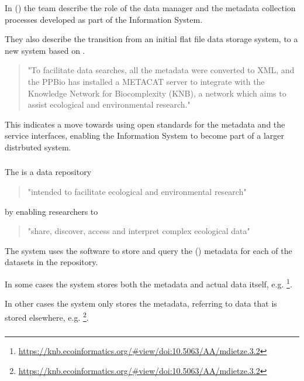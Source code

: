 \documentclass{article}
\begin{document}
In  (\cite{pezzini-2012}) 
the \cite{ppbio} team describe the role of the data manager and the metadata
collection processes developed as part of the \cite{ppbio} Information System.

They also describe the transition from an initial flat file data storage system,
to a new system based on \cite{metacat}.

\begin{quote}
"To facilitate data searches, all the metadata were converted to XML,
and the PPBio has installed a METACAT server to integrate with the
Knowledge Network for Biocomplexity (KNB), a network which aims to
assist ecological and environmental research."
\end{quote}

This indicates a move towards using open standards for the
metadata and the service interfaces, enabling the
\cite{ppbio} Information System
to become part of a larger distrbuted system.

\subsubsection{}

The  {\cite{knb}} is a data repository
\begin{quote}
"intended to facilitate ecological and environmental research"
\end{quote}
by enabling researchers to
\begin{quote}
"share, discover, access and interpret complex ecological data"
\end{quote}

The \cite{knb} system uses the \cite{metacat} software to store and query
the  (\cite{eml}) metadata for each of the datasets in the repository.

In some cases the \cite{knb} system stores both the metadata and actual
data itself, e.g.
\footnote{\url{https://knb.ecoinformatics.org/#view/doi:10.5063/AA/mdietze.3.2}}.

In other cases the \cite{knb} system only stores the metadata,
referring to data that is stored elsewhere, e.g.
\footnote{\url{https://knb.ecoinformatics.org/#view/doi:10.5063/AA/mdietze.3.2}}.

\subsubsection{\cite{metacat}}
\end{document}
